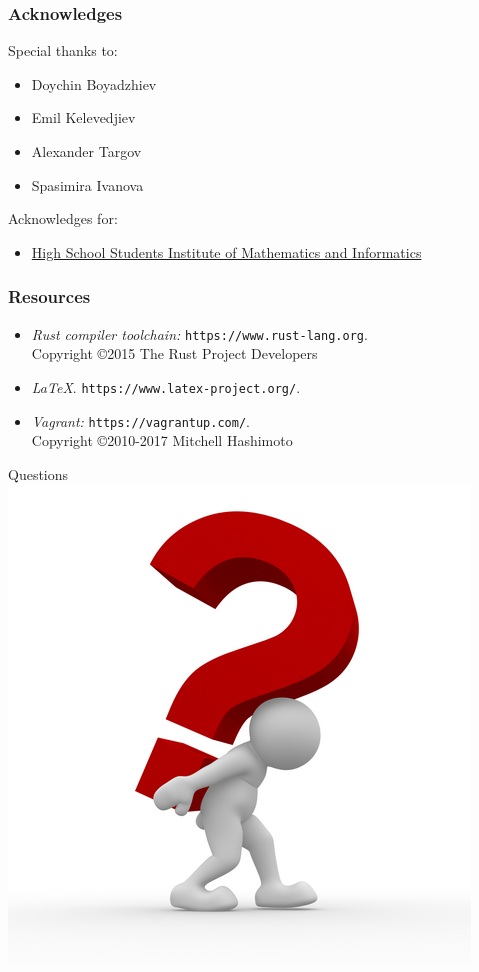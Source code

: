 \documentclass[12pt]{beamer}
\begin{document}
	\begin{frame}
		\frametitle{Acknowledges}
		Special thanks to:
		\begin{itemize}
			\item Doychin Boyadzhiev
			\item Emil Kelevedjiev
			\item Alexander Targov
			\item Spasimira Ivanova
		\end{itemize}
		\vspace{0.5cm}
		Acknowledges for:
		\begin{itemize}
			\item \href{http://www.math.bas.bg/omi/hssimi/}{High School Students Institute of Mathematics and Informatics}
		\end{itemize}
	\end{frame}
	
	\begin{frame}
	\frametitle{Resources}
		\begin{itemize}
			\item%
			{\itshape Rust compiler toolchain:}
			\texttt{https://www.rust-lang.org}. \\
            Copyright \copyright 2015 The Rust Project Developers
			\item%
			{\itshape \LaTeX}.
			\texttt{https://www.latex-project.org/}.
			\item
			{\itshape Vagrant:}
			\texttt{https://vagrantup.com/}.\\
			Copyright \copyright 2010-2017 Mitchell Hashimoto
		\end{itemize}
	\end{frame}
	
	\begin{frame}
	\begin{center}
	{\Huge Questions}
    \includegraphics[scale=0.3]{quest}
	\end{center}
	\end{frame}
	
\end{document}
